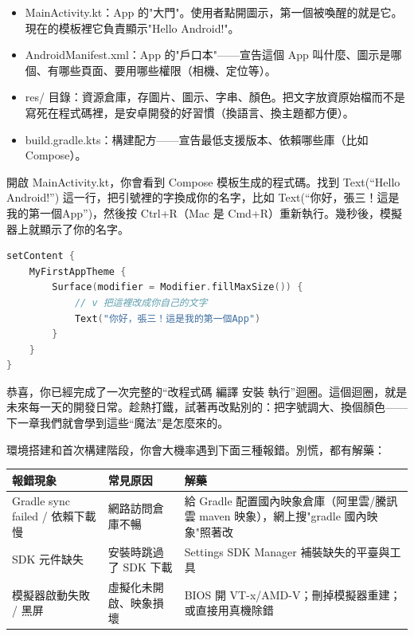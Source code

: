 \begin{itemize}
  \item MainActivity.kt：App 的"大門"。使用者點開圖示，第一個被喚醒的就是它。現在的模板裡它負責顯示"Hello Android!"。
  \item AndroidManifest.xml：App 的"戶口本"——宣告這個 App 叫什麼、圖示是哪個、有哪些頁面、要用哪些權限（相機、定位等）。
  \item res/ 目錄：資源倉庫，存圖片、圖示、字串、顏色。把文字放資原始檔而不是寫死在程式碼裡，是安卓開發的好習慣（換語言、換主題都方便）。
  \item build.gradle.kts：構建配方——宣告最低支援版本、依賴哪些庫（比如 Compose）。
\end{itemize}


開啟 MainActivity.kt，你會看到 Compose 模板生成的程式碼。找到 Text(“Hello Android!”) 這一行，把引號裡的字換成你的名字，比如 Text(“你好，張三！這是我的第一個App”)，然後按 Ctrl+R（Mac 是 Cmd+R）重新執行。幾秒後，模擬器上就顯示了你的名字。

\begin{lstlisting}[language=Kotlin]
setContent {
    MyFirstAppTheme {
        Surface(modifier = Modifier.fillMaxSize()) {
            // v 把這裡改成你自己的文字
            Text("你好，張三！這是我的第一個App")
        }
    }
}
\end{lstlisting}

恭喜，你已經完成了一次完整的“改程式碼 編譯 安裝 執行”迴圈。這個迴圈，就是未來每一天的開發日常。趁熱打鐵，試著再改點別的：把字號調大、換個顏色——下一章我們就會學到這些“魔法”是怎麼來的。


環境搭建和首次構建階段，你會大機率遇到下面三種報錯。別慌，都有解藥：

\begin{center}
\begin{tabularx}{\linewidth}{|X|X|X|}
\hline
\textbf{報錯現象} & \textbf{常見原因} & \textbf{解藥} \tabularnewline
\hline
Gradle sync failed / 依賴下載慢 & 網路訪問倉庫不暢 & 給 Gradle 配置國內映象倉庫（阿里雲/騰訊雲 maven 映象），網上搜"gradle 國內映象"照著改 \tabularnewline
SDK 元件缺失 & 安裝時跳過了 SDK 下載 & Settings SDK Manager 補裝缺失的平臺與工具 \tabularnewline
模擬器啟動失敗 / 黑屏 & 虛擬化未開啟、映象損壞 & BIOS 開 VT-x/AMD-V；刪掉模擬器重建；或直接用真機除錯 \tabularnewline
\hline
\end{tabularx}
\end{center}

